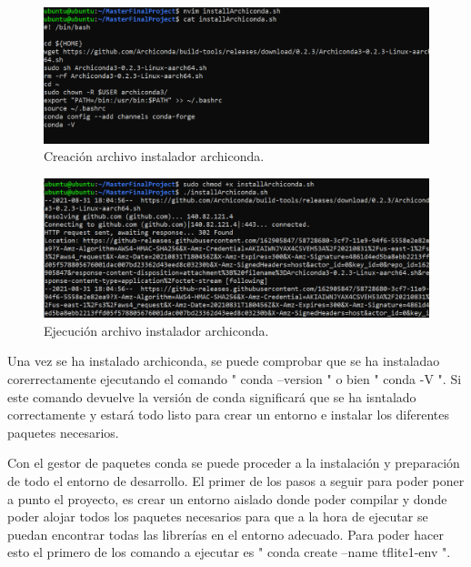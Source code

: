 \begin{figure}[h]
    \centering
    \includegraphics[scale=0.7]{fig/installArchiconda.PNG}
    \caption{Creación archivo instalador archiconda.}
    \label{fig:mesh1}
\end{figure}

\begin{figure}[h]
    \centering
    \includegraphics[scale=0.7]{fig/archicondaInstalling.PNG}
    \caption{Ejecución archivo instalador archiconda.}
    \label{fig:mesh1}
\end{figure}

Una vez se ha instalado archiconda, se puede comprobar que se ha instaladao corerrectamente ejecutando el comando " conda --version " o bien " conda -V ". Si este comando devuelve la versión de conda significará que se ha isntalado correctamente y estará todo listo para crear un entorno e instalar los diferentes paquetes necesarios.

Con el gestor de paquetes conda se puede proceder a la instalación y preparación de todo el entorno de desarrollo. El primer de los pasos a seguir para poder poner a punto el proyecto, es crear un entorno aislado donde poder compilar y donde poder alojar todos los paquetes necesarios para que a la hora de ejecutar se puedan encontrar todas las librerías en el entorno adecuado. Para poder hacer esto el primero de los comando a ejecutar es " conda create --name tflite1-env ".
 
